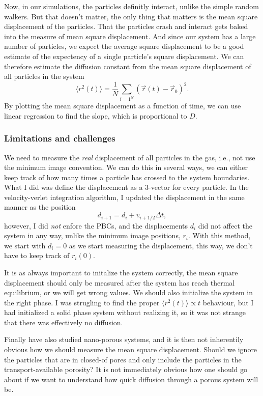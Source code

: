 \documentclass[a4paper, 11pt, notitlepage, english]{article}
\begin{document}
Now, in our simulations, the particles definitly interact, unlike the simple random walkers. But that doesn't matter, the only thing that matters is the mean square displacement of the particles. That the particles crash and interact gets baked into the measure of mean square displacement. And since our system has a large number of particles, we expect the average square displacement to be a good estimate of the expectency of a single particle's square displacement. We can therefore estimate the diffusion constant from the mean square displacement of all particles in the system
$$\langle r^2(t) \rangle = \frac{1}{N}\sum_{i=1^N} (\vec{r}(t) - \vec{r}_{0})^2.$$
By plotting the mean square displacement as a function of time, we can use linear regression to find the slope, which is proportional to $D$.

\subsubsection*{Limitations and challenges}

We need to measure the \emph{real} displacement of all particles in the gas, i.e., not use the minimum image convention. We can do this in several ways, we can either keep track of how many times a particle has crossed to the system boundaries. What I did was define the displacement as a 3-vector for every particle. In the velocity-verlet integration algorithm, I updated the displacement in the same manner as the position
$$d_{i+1} = d_i + v_{i+1/2}\Delta t,$$
however, I did \emph{not} enfore the PBCs, and the displacements $d_i$ did not affect the system in any way, unlike the minimum image positions, $r_i$. With this method, we start with $d_i = 0$ as we start measuring the displacement, this way, we don't have to keep track of $r_i(0)$.

It is as always important to initalize the system correctly, the mean square displacement should only be measured after the system has reach thermal equilibrium, or we will get wrong values. We should also initialize the system in the right phase. I was strugling to find the proper $\langle r^2(t) \rangle \propto t$ behaviour, but I had initialized a solid phase system without realizing it, so it was not strange that there was effectively no diffusion.

Finally have also studied nano-porous systems, and it is then not inherentily obvious how we should measure the mean square displacement. Should we ignore the particles that are in closed-of pores and only include the particles in the transport-available porosity? It is not immediately obvious how one should go about if we want to understand how quick diffusion through a porous system will be.
\end{document}

